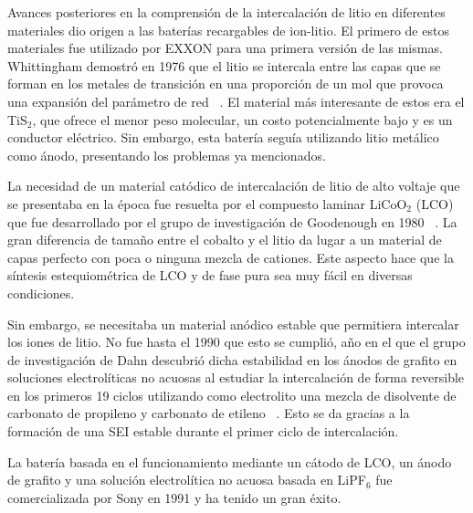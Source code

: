 Avances posteriores en la comprensión de la intercalación de litio en diferentes
materiales dio origen a las baterías recargables de ion-litio. El primero de 
estos materiales fue utilizado por EXXON para una primera versión de las mismas.
Whittingham demostró en 1976 que el litio se intercala entre las capas que se 
forman en los metales de transición en una proporción de un mol que provoca una
expansión del parámetro de red ~\cite{whittingham1976}. El material más 
interesante de estos era el TiS$_2$, que ofrece el menor peso molecular, un costo 
potencialmente bajo y es un conductor eléctrico. Sin embargo, esta batería seguía
utilizando litio metálico como ánodo, presentando los problemas ya mencionados. 

La necesidad de un material catódico de intercalación de litio de alto voltaje 
que se presentaba en la época fue resuelta por el compuesto laminar LiCoO$_2$ 
(LCO) que fue desarrollado por el grupo de investigación de Goodenough en 1980
~\cite{mizushima1980}. La gran diferencia de tamaño entre el cobalto y el litio 
da lugar a un material de capas perfecto con poca o ninguna mezcla de cationes. 
Este aspecto hace que la síntesis estequiométrica de LCO y de fase pura sea muy 
fácil en diversas condiciones. 

Sin embargo, se necesitaba un material anódico estable que permitiera intercalar
los iones de litio. No fue hasta el 1990 que esto se cumplió, año en el que el
grupo de investigación de Dahn descubrió dicha estabilidad en los ánodos de 
grafito en soluciones electrolíticas no acuosas al estudiar la intercalación de 
forma reversible en los primeros 19 ciclos utilizando como electrolito una mezcla 
de disolvente de carbonato de propileno y carbonato de etileno ~\cite{fong1990}. 
Esto se da gracias a la formación de una SEI estable durante el primer ciclo de 
intercalación. 

La batería basada en el funcionamiento mediante un cátodo de LCO, un ánodo de 
grafito y una solución electrolítica no acuosa basada en LiPF$_6$ fue 
comercializada por Sony en 1991 y ha tenido un gran éxito. 

